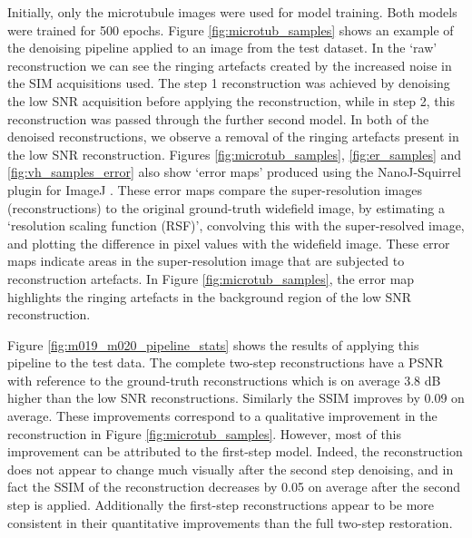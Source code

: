 \documentclass[12pt]{article}
\begin{document}
Initially, only the microtubule images were used for model training.
Both models were trained for 500 epochs.
Figure \ref{fig:microtub_samples} shows an example of the denoising pipeline applied to an image from the test dataset.
In the `raw' reconstruction we can see the ringing artefacts created by the increased noise in the SIM acquisitions used.
The step 1 reconstruction was achieved by denoising the low SNR acquisition before applying the reconstruction,
while in step 2, this reconstruction was passed through the further second model.
In both of the denoised reconstructions, we observe a removal of the ringing artefacts present in the low SNR reconstruction.
Figures \ref{fig:microtub_samples}, \ref{fig:er_samples} and \ref{fig:vh_samples_error} also show `error maps' produced using the NanoJ-Squirrel plugin for ImageJ \cite{squirrel}.
These error maps compare the super-resolution images (reconstructions) to the original ground-truth widefield image,
by estimating a `resolution scaling function (RSF)', convolving this with the super-resolved image,
and plotting the difference in pixel values with the widefield image.
These error maps indicate areas in the super-resolution image that are subjected to reconstruction artefacts.
In Figure \ref{fig:microtub_samples}, the error map highlights the ringing artefacts in the background region of the low SNR reconstruction.

Figure \ref{fig:m019_m020_pipeline_stats} shows the results of applying this pipeline to the test data.
The complete two-step reconstructions have a PSNR with reference to the ground-truth reconstructions which is on average 3.8 dB higher than the low SNR reconstructions.
Similarly the SSIM improves by 0.09 on average.
These improvements correspond to a qualitative improvement in the reconstruction in Figure \ref{fig:microtub_samples}.
However, most of this improvement can be attributed to the first-step model.
Indeed, the reconstruction does not appear to change much visually after the second step denoising,
and in fact the SSIM of the reconstruction decreases by 0.05 on average after the second step is applied.
Additionally the first-step reconstructions appear to be more consistent in their quantitative improvements than the full two-step restoration.
\end{document}
